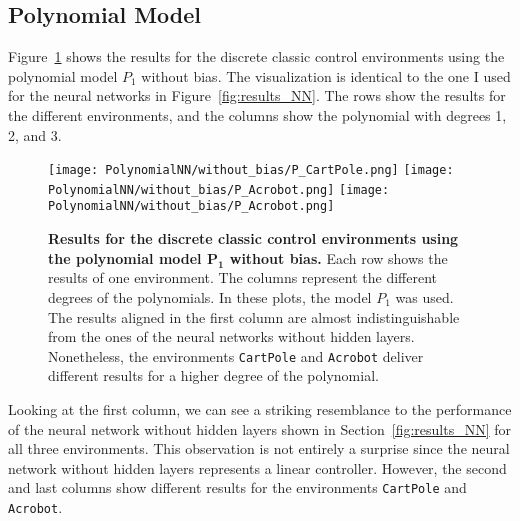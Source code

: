 \subsection{Polynomial Model}
Figure~\ref{fig:results_Polynomial} shows the results for the discrete classic control environments using the polynomial model $P_1$ without bias. The visualization is identical to the one I used for the neural networks in Figure~\ref{fig:results_NN}. The rows show the results for the different environments, and the columns show the polynomial with degrees 1, 2, and 3.
\begin{figure}[!ht]
  \centering
  \texttt{[image: PolynomialNN/without\_bias/P\_CartPole.png]}
  \texttt{[image: PolynomialNN/without\_bias/P\_Acrobot.png]}
  \texttt{[image: PolynomialNN/without\_bias/P\_Acrobot.png]}
\caption[Results for the discrete classic control environments using the polynomial model $\mathbf{P_1}$ without bias]{
  \textbf{Results for the discrete classic control environments using the polynomial model $\mathbf{P_1}$ without bias.}
   Each row shows the results of one environment. The columns represent the different degrees of the polynomials. In these plots, the model $P_1$ was used. The results aligned in the first column are almost indistinguishable from the ones of the neural networks without hidden layers. Nonetheless, the environments \texttt{CartPole} and \texttt{Acrobot} deliver different results for a higher degree of the polynomial.
}
\label{fig:results_Polynomial}
\end{figure}
Looking at the first column, we can see a striking resemblance to the performance of the neural network without hidden layers shown in Section~\ref{fig:results_NN} for all three environments. This observation is not entirely a surprise since the neural network without hidden layers represents a linear controller. However, the second and last columns show different results for the environments \verb|CartPole| and \verb|Acrobot|.

